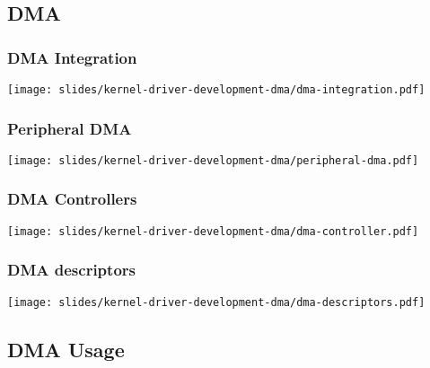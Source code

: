 \subsection{DMA}

\begin{frame}
  \frametitle{DMA Integration}
  \begin{center}
    \texttt{[image: slides/kernel-driver-development-dma/dma-integration.pdf]}
  \end{center}
\end{frame}

\begin{frame}
  \frametitle{Peripheral DMA}
  \begin{center}
    \texttt{[image: slides/kernel-driver-development-dma/peripheral-dma.pdf]}
  \end{center}
\end{frame}

\begin{frame}
  \frametitle{DMA Controllers}
  \begin{center}
    \texttt{[image: slides/kernel-driver-development-dma/dma-controller.pdf]}
  \end{center}
\end{frame}

\begin{frame}
  \frametitle{DMA descriptors}
  \begin{center}
    \texttt{[image: slides/kernel-driver-development-dma/dma-descriptors.pdf]}
  \end{center}
\end{frame}

\subsection{DMA Usage}

